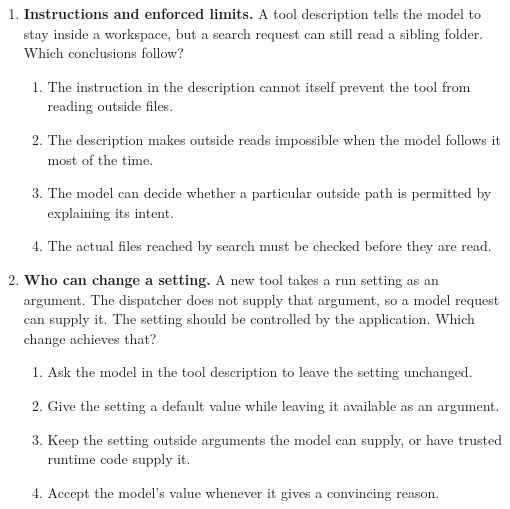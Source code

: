 \begin{enumerate}[start=31,itemsep=0.7\baselineskip]
\item\label{exercise:33} \begin{minipage}[t]{\linewidth}
\textbf{Instructions and enforced limits.} A tool description tells the model to stay inside a workspace, but a search request can still read a sibling folder. Which conclusions follow?
\begin{enumerate}[label=\textnormal{(\Alph*)},leftmargin=*,itemsep=0pt]
\item The instruction in the description cannot itself prevent the tool from reading outside files.
\item The description makes outside reads impossible when the model follows it most of the time.
\item The model can decide whether a particular outside path is permitted by explaining its intent.
\item The actual files reached by search must be checked before they are read.
\end{enumerate}
\end{minipage}

\item\label{exercise:34} \begin{minipage}[t]{\linewidth}
\textbf{Who can change a setting.} A new tool takes a run setting as an argument. The dispatcher does not supply that argument, so a model request can supply it. The setting should be controlled by the application. Which change achieves that?
\begin{enumerate}[label=\textnormal{(\Alph*)},leftmargin=*,itemsep=0pt]
\item Ask the model in the tool description to leave the setting unchanged.
\item Give the setting a default value while leaving it available as an argument.
\item Keep the setting outside arguments the model can supply, or have trusted runtime code supply it.
\item Accept the model's value whenever it gives a convincing reason.
\end{enumerate}
\end{minipage}


\end{enumerate}
